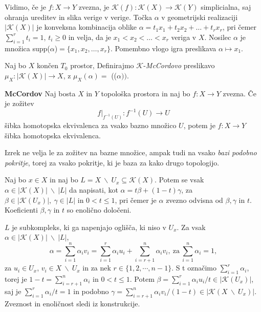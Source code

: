 \documentclass[mat1]{fmfdelo}
\begin{document}
Vidimo, če je $f: X\rightarrow Y$ zvezna, je $\mathcal{K}(f):\mathcal{K}(X) \rightarrow \mathcal{K}(Y)$ simplicialna, saj ohranja ureditev in slika verige v verige.
Točka $\alpha$ v geometrijski realizaciji $|\mathcal{K}(X)|$ je
konveksna kombinacija oblike
$\alpha = t_1x_1+t_2x_2 + \ldots + t_r x_r$, pri čemer 
$\sum_{i=1}^{r}t_i=1$, $t_i \ge 0$ in 
velja, da je $x_1 < x_2 < \ldots < x_r$ veriga v $X$.
Nosilec $\alpha$ je množica supp($\alpha$)$= \{x_1,x_2,\ldots,x_r\}$. Pomembno vlogo igra 
 preslikava $\alpha \mapsto x_1$.

 \begin{definicija}
    Naj bo $X$ končen $T_0$ prostor, Definirajmo
    $\mathcal{K}$-\textit{McCordovo} preslikavo $\mu_X:|\mathcal{K}
    (X)|\rightarrow X$, z $\mu_X(\alpha) =$
    (($\alpha))$.
\end{definicija}



\begin{izrek}{\textbf{McCordov}}
    Naj bosta $X$ in $Y$ topološka prostora in naj bo $f:X\rightarrow Y$ zvezna. Če je zožitev
    $$
    f|_{f^{-1}(U)}:f^{-1}(U)\rightarrow U
    $$
    šibka homotopska ekvivalenca za vsako bazno množico $U$, potem je $f:X\rightarrow Y$  šibka homotopska ekvivalenca.
\label{iz:mccord}
\end{izrek}


\begin{opomba}
    Izrek ne velja le za zožitev na bazne množice, ampak tudi na vsako \textit{bazi podobno pokritje}, torej za vsako pokritje, ki je baza za kako drugo topologijo.
\end{opomba}



\begin{lema}
    Naj bo $x\in X$ in naj bo $L=X\ \backslash \
    U_x\subseteq \mathcal{K}(X)$. Potem se vsak $\alpha \in |\mathcal{K}(X)|\ \backslash \ |L|$ da napisati, kot $\alpha = t\beta + (1-t)\gamma$, za $\beta \in |\mathcal{K}(U_x)|, \ \gamma \in |L|$ in $0<t\leq 1$, pri čemer je $\alpha$ zvezno odvisna od $\beta, \gamma$ in $t$. Koeficienti $\beta, \gamma$ in $t$ so enolično določeni.
\label{lem:sibka}
\end{lema}

\begin{dokaz}
    $L$ je subkompleks, ki ga napenjajo oglišča, ki niso v $U_x$. Za vsak $\alpha \in |\mathcal{K}(X)|\ \backslash \ |L|$, 
    $$\alpha = \sum_{i=1}^{n} \alpha_i v_i 
    = \sum_{i=1}^{r} \alpha_i u_i + \sum_{i=r+1}^{n}\alpha_i v_i,\ \text{za}\ \sum_{i=1}^{n} \alpha_i=1,
    $$
    za $u_i \in U_x$, $v_i \in X \ \backslash \ U_x$ in za nek $r\in \{1,2, \cdots, n-1\}$. S t označimo $\sum_{i=1}^{r} \alpha_i$, torej je $1-t=\sum_{i=r+1}^{n} \alpha_i$ in $0<t\leq 1$. Potem $\beta =\sum_{i=1}^{r} \alpha_i u_i/t \in |\mathcal{K}(U_x)|$, saj je $\sum_{i=1}^{r} \alpha_i/t=1$ in podobno $\gamma=\sum_{i=r+1}^{n} 
    \alpha_i v_i/(1-t) \in |\mathcal{K}(X \ \backslash \ U_x)|$. Zveznost in enoličnost sledi iz konstrukcije.

\end{dokaz}
\end{document}

